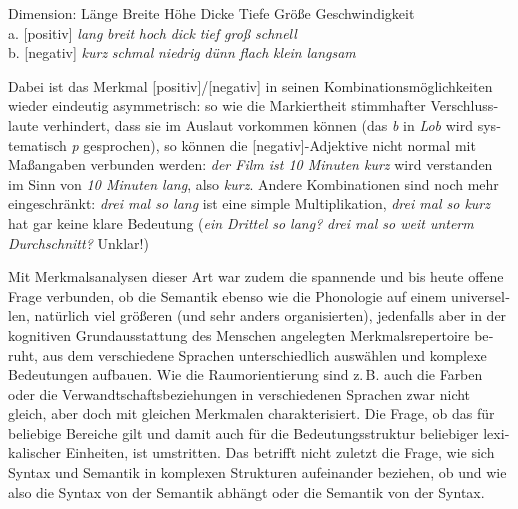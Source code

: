 \documentclass[output=paper,colorlinks,citecolor=brown]{langscibook}
\begin{document}
\begin{otherlanguage}{german}
\ea
\glll Dimension: Länge Breite Höhe Dicke Tiefe Größe Geschwindigkeit \\
{a. [positiv]} \textit{lang} \textit{breit} \textit{hoch} \textit{dick} \textit{tief} \textit{groß} \textit{schnell} \\
{b. [negativ]} \textit{kurz} \textit{schmal} \textit{niedrig} \textit{dünn} \textit{flach} \textit{klein} \textit{langsam} \\ 
\label{ex:9}
\z

\noindent Dabei ist das Merkmal [positiv]/[negativ] in seinen Kombinationsmöglichkeiten wieder eindeutig asymmetrisch: so wie die Markiertheit stimmhafter Verschlusslaute verhindert, dass sie im Auslaut vorkommen können (das \textit{b} in \textit{Lob} wird systematisch \textit{p} gesprochen), so können die [negativ]-Adjektive nicht normal mit Maßangaben verbunden werden: \textit{der Film ist 10 Minuten kurz} wird verstanden im Sinn von \textit{10 Minuten lang}, also \textit{kurz}. Andere Kombinationen sind noch mehr eingeschränkt: \textit{drei mal so lang} ist eine simple Multiplikation, \textit{drei mal so kurz} hat gar keine klare Bedeutung (\textit{ein Drittel so lang?} \textit{drei mal so weit unterm Durchschnitt?} Unklar!)

Mit Merkmalsanalysen dieser Art war zudem die spannende und bis heute offene Frage verbunden, ob die Semantik ebenso wie die Phonologie auf einem universellen, natürlich viel größeren (und sehr anders organisierten), jedenfalls aber in der kognitiven Grundausstattung des Menschen angelegten Merkmals\-repertoire beruht, aus dem verschiedene Sprachen unterschiedlich auswählen und komplexe Bedeutungen aufbauen. Wie die Raumorientierung sind z.\,B. auch die Farben oder die Verwandtschaftsbeziehungen in verschiedenen Sprachen zwar nicht gleich, aber doch mit gleichen Merkmalen charakterisiert. Die Frage, ob das für beliebige Bereiche gilt und damit auch für die Bedeutungsstruktur beliebiger lexikalischer Einheiten, ist umstritten. Das betrifft nicht zuletzt die Frage, wie sich Syntax und Semantik in komplexen Strukturen aufeinander beziehen, ob und wie also die Syntax von der Semantik abhängt oder die Semantik von der Syntax.

\label{sec:3}


\end{otherlanguage}
\end{document}
